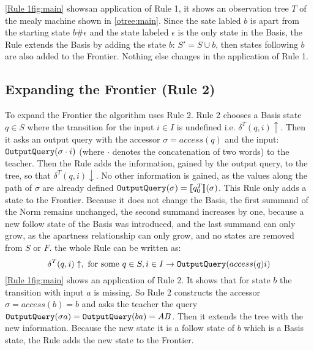 \autoref{Rule 1fig:main} showsan application of Rule 1, it shows an observation tree $T$ of the mealy machine shown in \autoref{otree:main}. Since the sate labled $b$ is apart from the starting state $b\#\epsilon$ and the state labeled $\epsilon$ is the only state in the Basis, the Rule extends the Basis by adding the state $b$: $S'=S\cup{b}$, then states following $b$ are also added to the Frontier. Nothing else changes in the application of Rule 1.

\subsection{Expanding the Frontier (Rule 2)}
To expand the Frontier the algorithm uses Rule 2. Rule 2 chooses a Basis state $q\in S$ where the transition for the input $i\in I$ is undefined i.e. $\delta^T(q,i)\uparrow$. Then it asks an output query with the accessor $\sigma=access(q)$ and the input: $\textnormal{\texttt{OutputQuery}}(\sigma\cdot i)$ (where $\cdot$ denotes the concatenation of two words) to the teacher. Then the Rule adds the information, gained by the output query, to the tree, so that $\delta^T(q,i)\downarrow$. No other information is gained, as the values along the path of $\sigma$ are already defined $\textnormal{\texttt{OutputQuery}}(\sigma)=\llbracket q_0^T\rrbracket(\sigma)$. This Rule only adds a state to the Frontier. Because it does not change the Basis, the first summand of the Norm remains unchanged, the second summand increases by one, because a new follow state of the Basis was introduced, and the last summand can only grow, as the apartness relationship can only grow, and no states are removed from $S$ or $F$. the whole Rule can be written as:
$$
\delta^T(q,i)\uparrow, \text{ for some } q\in S, i\in I\rightarrow \texttt{\textnormal{\texttt{OutputQuery}}}(access(q)i)
$$
\autoref{Rule 1fig:main} shows an application of Rule 2. It shows that for state $b$ the transition with input $a$ is missing. So Rule 2 constructs the accessor $\sigma=access(b)=b$ and asks the teacher the query $\textnormal{\texttt{OutputQuery}}(\sigma a)=\textnormal{\texttt{OutputQuery}}(ba)=AB$. Then it extends the tree with the new information. Because the new state it is a follow state of $b$ which is a Basis state, the Rule adds the new state to the Frontier.
